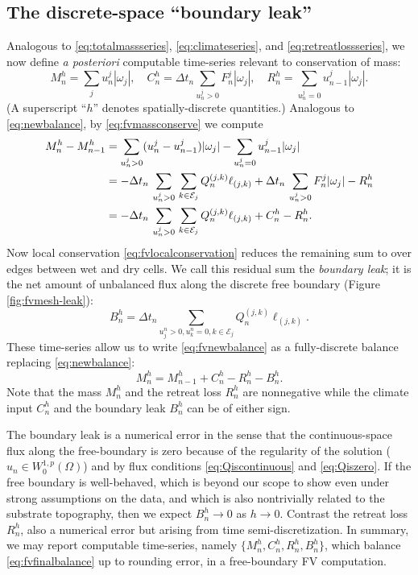 \documentclass[final,onefignum]{siamart190516}
\begin{document}
\subsection{The discrete-space ``boundary leak''}  \label{subsec:leak}  Analogous to \eqref{eq:totalmassseries}, \eqref{eq:climateseries}, and \eqref{eq:retreatlossseries}, we now define \emph{a posteriori} computable time-series relevant to conservation of mass:
\begin{equation}
M_n^h = \sum_j u_n^j |\omega_j|, \quad C_n^h = \Delta t_n\!\!\sum_{u_n^j>0} F_n^j |\omega_j|, \quad R_n^h = \sum_{u_n^j=0} u_{n-1}^j |\omega_j|.  \label{eq:fvtimeseriesdefn}
\end{equation}
(A superscript ``$h$'' denotes spatially-discrete quantities.)  Analogous to \eqref{eq:newbalance}, by \eqref{eq:fvmassconserve} we compute
\begin{align}
M_n^h - M_{n-1}^h &= \sum_{u_n^j>0} (u_n^j - u_{n-1}^j) |\omega_j| - \sum_{u_n^j=0} u_{n-1}^j |\omega_j| \notag \\
   &= - \Delta t_n\,\sum_{u_n^j>0}\, \sum_{k\in\mathcal{E}_j} Q_n^{(j,k)} \ell_{(j,k)} + \Delta t_n\,\sum_{u_n^j>0} F_n^j |\omega_j| - R_n^h \notag \\
   &= - \Delta t_n\,\sum_{u_n^j>0}\, \sum_{k\in\mathcal{E}_j} Q_n^{(j,k)} \ell_{(j,k)} + C_n^h - R_n^h.  \label{eq:fvnewbalance}
\end{align}
Now local conservation \eqref{eq:fvlocalconservation} reduces the remaining sum to over edges between wet and dry cells.  We call this residual sum the \emph{boundary leak}; it is the net amount of unbalanced flux along the discrete free boundary (Figure \ref{fig:fvmesh-leak}):
\begin{equation}
B_n^h = \Delta t_n \sum_{u_j^n > 0, u_k^n = 0, k\in\mathcal{E}_j} Q_n^{(j,k)} \ell_{(j,k)}. \label{eq:fvdefineleak}
\end{equation}
These time-series allow us to write \eqref{eq:fvnewbalance} as a fully-discrete balance replacing \eqref{eq:newbalance}:
\begin{equation}
  M_n^h = M_{n-1}^h + C_n^h - R_n^h - B_n^h. \label{eq:fvfinalbalance}
\end{equation}
Note that the mass $M_n^h$ and the retreat loss $R_n^h$ are nonnegative while the climate input $C_n^h$ and the boundary leak $B_n^h$ can be of either sign.

The boundary leak is a numerical error in the sense that the continuous-space flux along the free-boundary is zero because of the regularity of the solution ($u_n \in W_0^{1,p}(\Omega)$) and by flux conditions \eqref{eq:Qiscontinuous} and \eqref{eq:Qiszero}.  If the free boundary is well-behaved, which is beyond our scope to show even under strong assumptions on the data, and which is also nontrivially related to the substrate topography, then we expect $B_n^h\to 0$ as $h\to 0$.  Contrast the retreat loss $R_n^h$, also a numerical error but arising from time semi-discretization.  In summary, we may report computable time-series, namely $\{M_n^h,C_n^h,R_n^h,B_n^h\}$, which balance \eqref{eq:fvfinalbalance} up to rounding error, in a free-boundary FV computation.
\end{document}
